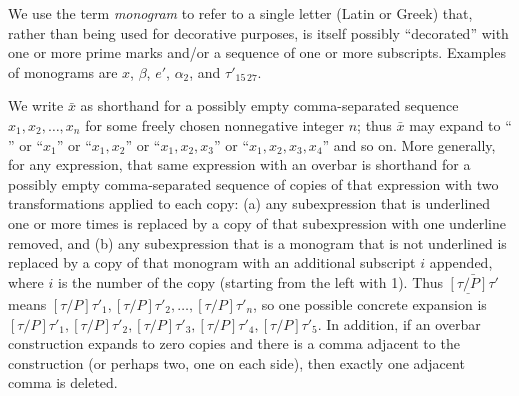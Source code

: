 We use the term \emph{monogram} to refer to a single letter (Latin or Greek)  that, rather than being used for decorative purposes, is itself possibly ``decorated'' with one or more prime marks and/or a sequence of one or more subscripts.  Examples of monograms are $x$, $\beta$, $e'$, $\alpha_2$, and $\tau'_{15\,27}$.

We write $\bar{x}$ as shorthand for a possibly empty comma-separated sequence $x_1, x_2, \ldots, x_n$ for some freely chosen nonnegative integer $n$;
thus $\bar{x}$ may expand to `` '' or ``$x_1$'' or ``$x_1, x_2$'' or ``$x_1, x_2, x_3$'' or ``$x_1, x_2, x_3, x_4$'' and so on.
More generally, for any expression, that same expression with an overbar is shorthand for a possibly empty comma-separated sequence
of copies of that expression with two transformations applied to each copy: (a) any subexpression that is underlined one or more times
is replaced by a copy of that subexpression with one underline removed, and (b) any subexpression that is a monogram that is not underlined
is replaced by a copy of that monogram with an additional subscript $i$ appended, where $i$ is the number of the copy (starting from the left with 1).
Thus $\bar{\underline{[\tau/P]}\tau'}$ means $[\tau/P]\tau'_1, [\tau/P]\tau'_2, \dots, [\tau/P]\tau'_n$,
so one possible concrete expansion is $[\tau/P]\tau'_1, [\tau/P]\tau'_2, [\tau/P]\tau'_3, [\tau/P]\tau'_4, [\tau/P]\tau'_5$.
In addition, if an overbar construction expands to zero copies and there is a comma adjacent to the construction (or perhaps two, one on each side), then exactly one adjacent comma is deleted.



